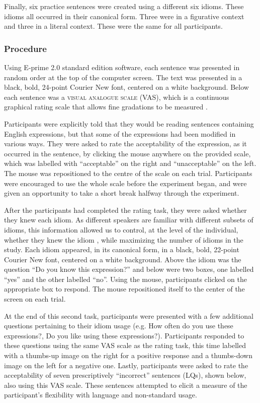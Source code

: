 \documentclass[output=paper,modfonts,nonflat]{langsci/langscibook}
\begin{document}
Finally, six practice sentences were created using a different six idioms. These idioms all occurred in their canonical form. Three were in a figurative context and three in a literal context. These were the same for all participants. 


\subsubsection{Procedure}

Using E-prime 2.0 standard edition software, each sentence was presented in random order at the top of the computer screen. The text was presented in a black, bold, 24-point Courier New font, centered on a white background. Below each sentence was a \textsc{visual analogue scale} (VAS), which is a continuous graphical rating scale that allows fine gradations to be measured \citep{FunkeReips2012}. 

Participants were explicitly told that they would be reading sentences containing English expressions, but that some of the expressions had been modified in various ways. They were asked to rate the acceptability of the expression, as it occurred in the sentence, by clicking the mouse anywhere on the provided scale, which was labelled with ``acceptable'' on the right and ``unacceptable'' on the left. The mouse was repositioned to the centre of the scale on each trial. Participants were encouraged to use the whole scale before the experiment began, and were given an opportunity to take a short break halfway through the experiment. 

After the participants had completed the rating task, they were asked whether they knew each idiom. As different speakers are familiar with different subsets of idioms, this information allowed us to control, at the level of the individual, whether they knew the idiom \citep{Cacciari2005}, while maximizing the number of idioms in the study. Each idiom appeared, in its canonical form, in a black, bold, 22-point Courier New font, centered on a white background. Above the idiom was the question ``Do you know this expression?'' and below were two boxes, one labelled ``yes'' and the other labelled ``no''. Using the mouse, participants clicked on the appropriate box to respond. The mouse repositioned itself to the center of the screen on each trial.

At the end of this second task, participants were presented with a few additional questions pertaining to their idiom usage (e.g. How often do you use these expressions?, Do you like using these expressions?). Participants responded to these questions using the same VAS scale as the rating task, this time labelled with a thumbs-up image on the right for a positive response and a thumbs-down image on the left for a negative one. Lastly, participants were asked to rate the acceptability of seven prescriptively ``incorrect'' sentences (LQs), shown below, also using this VAS scale. These sentences attempted to elicit a measure of the participant's flexibility with language and non-standard usage.
\end{document}
